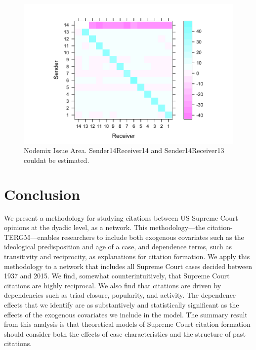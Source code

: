 \documentclass[headsepline=true, abstracton]{scrartcl}
\begin{document}
 \begin{figure}[H]
\includegraphics[width=15cm]{heatplot_issue_area}
\caption{Nodemix Issue Area. Sender14Receiver14 and Sender14Receiver13 couldnt be estimated.}
 \label{number_supporting}
\vspace{-.25cm}
\end{figure} 

\section{Conclusion}

We present a methodology for studying citations between US Supreme Court opinions at the dyadic level, as a network. This methodology---the citation-TERGM---enables researchers to include both exogenous covariates such as the ideological predisposition and age of a case, and dependence terms, such as transitivity and reciprocity, as explanations for citation formation. We apply this methodology to a network that includes all Supreme Court cases decided between 1937 and 2015. We find, somewhat counterintuitively, that Supreme Court citations are highly reciprocal. We also find that citations are driven by dependencies such as triad closure, popularity, and activity. The dependence effects that we identify are as substantively and statistically significant as the effects of the exogenous covariates we include in the model. The summary result from this analysis is that theoretical models of Supreme Court citation formation should consider both the effects of case characteristics and the structure of past citations. 
\end{document}
